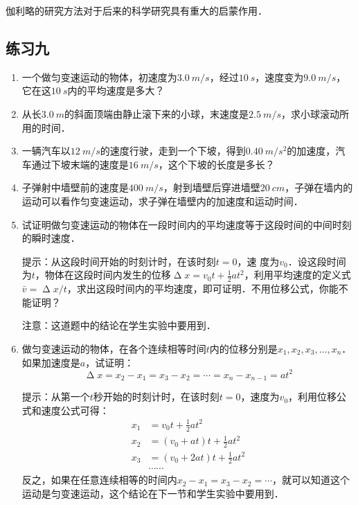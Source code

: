 伽利略的研究方法对于后来的科学研究具有重大的启蒙作用．

\subsection*{练习九}
\begin{enumerate}
    \item 一个做匀变速运动的物体，初速度为$\qty{3.0}{m/s}$，经过$\qty{10}{s}$，速度变为$\qty{9.0}{m/s}$，它在这$\qty{10}{s}$内的平均速度是多大？
    \item 从长$\qty{3.0}{m}$的斜面顶端由静止滚下来的小球，末速度是$\qty{2.5}{m/s}$，求小球滚动所用的时间．
    \item 一辆汽车以$\qty{12}{m/s}$的速度行驶，走到一个下坡，得到$\qty{0.40}{m/s^2}$的加速度，汽车通过下坡末端的速度是$\qty{16}{m/s}$，这个下坡的长度是多长？
    \item 子弹射中墙壁前的速度是$\qty{400}{m/s}$，射到墙壁后穿进墙壁$\qty{20}{cm}$，子弹在墙内的运动可以看作匀变速运动，求子弹在墙壁内的加速度和运动时间．
    \item 试证明做匀变速运动的物体在一段时间内的平均速度等于这段时间的中间时刻的瞬时速度．

          提示：从这段时间开始的时刻计时，在该时刻$t=0$，速
          度为$v_0$．设这段时间为$t$，物体在这段时间内发生的位移$\upDelta x=v_0t +\frac{1}{2}at^2$，利用平均速度的定义式$\bar v=\upDelta x/t$，求出这段时间内的平均速度，即可证明．不用位移公式，你能不能证明？

          注意：这道题中的结论在学生实验中要用到．

    \item 做匀变速运动的物体，在各个连续相等时间$t$内的位移分别是$x_1, x_2, x_3,\ldots,x_n$．如果加速度是$a$，试证明：
          \[\upDelta x=x_2-x_1=x_3-x_2=\cdots=x_n-x_{n-1}=at^2 \]

          提示：从第一个$t$秒开始的时刻计时，在该时刻$t=0$，速度为$v_0$，利用位移公式和速度公式可得：
          \[\begin{split}
                  x_1 & =v_0t +\frac{1}{2}at^2       \\
                  x_2 & =(v_0+at)t +\frac{1}{2}at^2  \\
                  x_3 & =(v_0+2at)t +\frac{1}{2}at^2 \\
                      & \cdots\cdots
              \end{split} \]
          反之，如果在任意连续相等的时间内$x_2-x_1=x_3-x_2=\cdots$，就可以知道这个运动是匀变速运动，这个结论在下一节和学生实验中要用到．
\end{enumerate}


